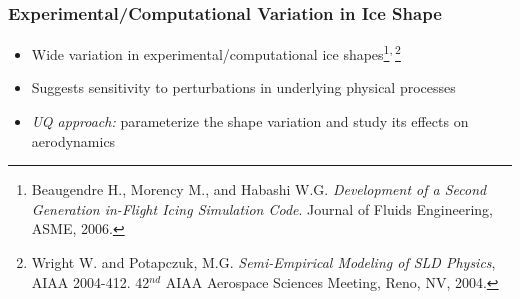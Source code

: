 \documentclass[9pt]{beamer}
\begin{document}
\begin{frame}
\frametitle{Experimental/Computational Variation in Ice Shape}
\label{sec-1-2}


\vspace*{-0.5cm}\begin{figure}
  \begin{subfigmatrix}{2}
  \end{subfigmatrix}
\end{figure}

\begin{itemize}
\item Wide variation in experimental/computational ice shapes\footnote{Beaugendre H., Morency M., and Habashi W.G. \emph{Development of a Second Generation in-Flight Icing Simulation Code}. Journal of
Fluids Engineering, ASME, 2006.
 }\textsuperscript{,}\,\footnote{Wright W. and Potapczuk, M.G. \emph{Semi-Empirical Modeling of SLD Physics}, AIAA 2004-412. 42$^{nd}$ AIAA Aerospace Sciences
Meeting, Reno, NV, 2004.
 }
\item Suggests sensitivity to perturbations in underlying physical
  processes
\item \emph{UQ approach:} parameterize the shape variation and study its
  effects on aerodynamics
\end{itemize}
\end{frame}
\end{document}

